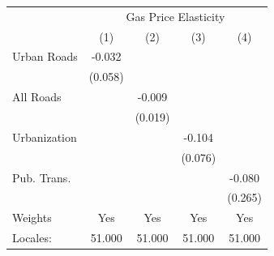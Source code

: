 {
\def\sym#1{\ifmmode^{#1}\else\(^{#1}\)\fi}
\begin{tabular}{l*{4}{c}}
\hline\hline
            &\multicolumn{4}{c}{Gas Price Elasticity}                                               \\
            &\multicolumn{1}{c}{(1)}         &\multicolumn{1}{c}{(2)}         &\multicolumn{1}{c}{(3)}         &\multicolumn{1}{c}{(4)}         \\
\hline
Urban Roads &      -0.032         &                     &                     &                     \\
            &     (0.058)         &                     &                     &                     \\
[1em]
All Roads   &                     &      -0.009         &                     &                     \\
            &                     &     (0.019)         &                     &                     \\
[1em]
Urbanization&                     &                     &      -0.104         &                     \\
            &                     &                     &     (0.076)         &                     \\
[1em]
Pub. Trans. &                     &                     &                     &      -0.080         \\
            &                     &                     &                     &     (0.265)         \\
\hline
Weights     &         Yes         &         Yes         &         Yes         &         Yes         \\
Locales:    &      51.000         &      51.000         &      51.000         &      51.000         \\
\hline\hline
\end{tabular}
}
